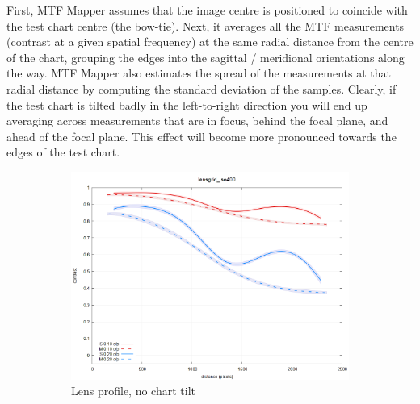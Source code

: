 \documentclass[a4paper]{article}
\begin{document}
First, MTF Mapper assumes that the image centre is positioned to coincide
with the test chart centre (the bow-tie). Next, it averages all the MTF
measurements (contrast at a given spatial frequency) at the same radial
distance from the centre of the chart, grouping the edges into the sagittal
/ meridional orientations along the way. MTF Mapper also estimates the
spread of the measurements at that radial distance by computing the standard
deviation of the samples. Clearly, if the test chart is tilted badly in the
left-to-right direction you will end up averaging across measurements that
are in focus, behind the focal plane, and ahead of the focal plane. This
effect will become more pronounced towards the edges of the test chart.

\begin{figure}[!ht]
\centering
\begin{subfigure}[b]{0.5\textwidth}
    \includegraphics[width=\textwidth]{figures/lg_exmple_flat_lensgrid.png}
    \caption{Lens profile, no chart tilt}
\end{subfigure}
$\quad$
\begin{subfigure}[b]{0.25\textwidth}

\end{subfigure}
\end{figure}
\end{document}
